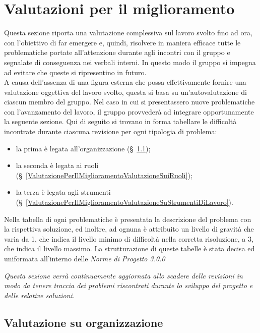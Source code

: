 \chapter{Valutazioni per il miglioramento} \label{ValutazionePerIlMiglioramento}
Questa sezione riporta una valutazione complessiva sul lavoro svolto fino ad ora, con l’obiettivo di far emergere e, quindi, risolvere in maniera efficace tutte le problematiche portate all'attenzione durante agli incontri con il gruppo e segnalate di conseguenza nei verbali interni. In questo modo il gruppo si impegna ad evitare che queste si ripresentino in futuro.\\
A causa dell’assenza di una figura esterna che possa effettivamente fornire una valutazione oggettiva del lavoro svolto, questa si basa su un'autovalutazione di ciascun membro del gruppo.
Nel caso in cui si presentassero nuove problematiche con l’avanzamento del lavoro, il gruppo provvederà ad integrare opportunamente la seguente sezione. Qui di seguito si trovano in forma tabellare le difficoltà incontrate durante ciascuna revisione per ogni tipologia di problema:
\begin{itemize}
	\item la prima è legata all'organizzazione (\S~\ref{ValutazionePerIlMiglioramentoValutazioneSuOrganizzazione});
	\item la seconda è legata ai ruoli (\S~\ref{ValutazionePerIlMiglioramentoValutazioneSuiRuoli});
	\item la terza è legata agli strumenti (\S~\ref{ValutazionePerIlMiglioramentoValutazioneSuStrumentiDiLavoro}).
\end{itemize}
Nella tabella di ogni problematiche è presentata la descrizione del problema con la rispettiva soluzione, ed inoltre, ad ognuna è attribuito un livello di gravità che varia da 1, che indica il livello minimo di difficoltà nella corretta risoluzione, a 3, che indica il livello massimo.
La strutturazione di queste tabelle è stata decisa ed uniformata all'interno delle \textit{Norme di Progetto 3.0.0}

\textit{Questa sezione verrà continuamente aggiornata allo scadere delle revisioni in modo da tenere traccia dei problemi riscontrati durante lo sviluppo del progetto e delle relative soluzioni.}
\clearpage

\section{Valutazione su organizzazione}  \label{ValutazionePerIlMiglioramentoValutazioneSuOrganizzazione}

